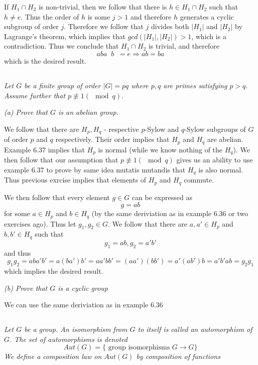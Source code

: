 \documentclass[11pt,oneside,titlepage]{book}
\DeclareMathOperator \inv {^{-1}}
\DeclareMathOperator \ra {\Rightarrow}
\newcommand{\set}[1]{\{ #1 \}}
\begin{document}
If $H_1 \cap H_2$ is non-trivial, then we follow that there is $h \in
H_1 \cap H_2$ such that $h \neq e$. Thus the order of $h$ is some
$j > 1$ and therefore $h$ generates a cyclic subgroup of
order $j$. Therefore we follow that $j$ divides both $|H_1|$
and $|H_2|$ by Lagrange's theorem, which implies that
$gcd(|H_1|, |H_2|) > 1$, which is a contradiction. Thus we conclude that
$H_1 \cap H_2$ is trivial, and therefore
$$aba\inv b\inv = e \ra ab = ba$$
which is the desired result.

\subsection{}

\textit{Let $G$ be a finite group of order $|G| = pq$ where $p, q$ are
  primes satisfying $p > q$. Assume further that $p \not \equiv 1 (\mod
  q)$. }

\textit{(a) Prove that $G$ is an abelian group. }

We follow that there are $H_p, H_q$ - respective $p$-Sylow and
$q$-Sylow subgroups of $G$ of order $p$ and $q$ respectively.  Their
order implies that $H_p$ and $H_q$ are abelian. Example 6.37 implies
that $H_p$ is normal (while we know nothing of the $H_q$).  We then
follow that our assumption that $p \not \equiv 1 (\mod q)$ gives us an
ability to use example 6.37 to prove by same idea mutatis mutandis
that $H_q$ is also normal. Thus previous exrcise implies that elements
of $H_p$ and $H_q$ commute.

We then follow that every element $g \in G$ can be expressed as
$$g = a b$$
for some $a \in H_p$ and $b \in H_q$ (by the same deriviation as in
example 6.36 or two exercises ago). Thus let $g_1, g_2 \in G$. We
follow that there are $a, a' \in H_p$ and $b, b' \in H_q$ such that
$$g_1 = a b, g_2 = a' b'$$
and thus
$$g_1 g_2 = ab a' b' = a (b a') b' = a a' b b'
= (a a') (b b') = a' (a b') b = a' b' a b = g_2 g_1$$ which implies
the desired result.

\textit{(b) Prove that $G$ is a cyclic group}

We can use the same deriviation as in example 6.36

\subsection{}

\textit{Let $G$ be a group. An isomorphism from $G$ to itself is
  called an automorphism of $G$. The set of automorphisms is denoted
  $$Aut(G) = \set{\text{ group isomorphisms } G \to G}$$
  We define a composition law on $Aut(G)$ by composition of functions
}
\end{document}
